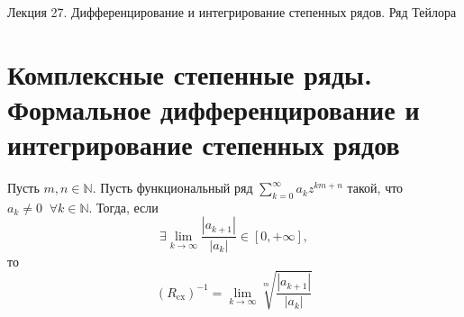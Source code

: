 \documentclass[11pt]{article}
\begin{document}
\begin{titlepage}
    \centering
    \vspace*{\fill}  %

    {\Huge Лекция 27. Дифференцирование и интегрирование степенных рядов. Ряд Тейлора
    \par}

    \vspace*{\fill}  %
\end{titlepage}

\setcounter{page}{1}

\section{Комплексные степенные ряды. Формальное дифференцирование и интегрирование степенных рядов}

\begin{lemma}
    Пусть $m, n \in \mathbb{N}$. Пусть функциональный ряд $\displaystyle \sum_{k = 0}^{\infty} a_k z^{km + n}$ такой, что $a_k \neq 0 \; \; \forall k \in \mathbb{N}$. Тогда, если 
    \[\exists \lim_{k \to \infty} \frac{\left\lvert a_{k + 1}\right\rvert }{\left\lvert a_k \right\rvert } \in [0, +\infty],\]
    то
    \[\left(R_{\text{cx}}\right)^{-1} = \lim_{k \to \infty} \sqrt[m]{\frac{\left\lvert a_{k + 1}\right\rvert }{\left\lvert a_k \right\rvert }}\]
\end{lemma}
\end{document}
